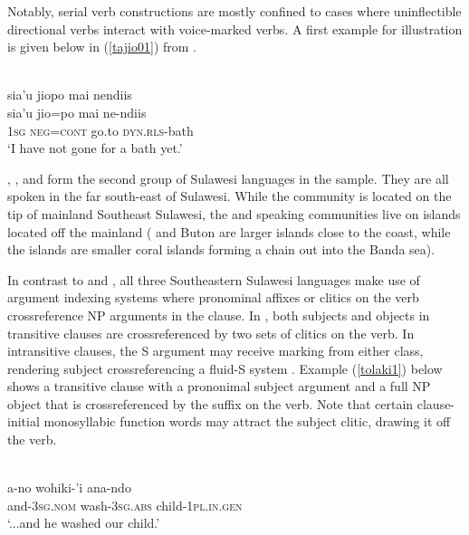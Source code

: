 Notably, serial verb constructions are mostly confined to cases where uninflectible directional verbs interact with voice-marked verbs. A first example for illustration is given below in (\ref{tajio01}) from .

\ea \label{tajio01}
\\
\glll sia’u jiopo mai nendiis \\
sia’u jio=po mai ne-ndiis \\
 \textsc{1}\textsc{sg} \textsc{neg}=\textsc{cont} go.to \textsc{dyn}.\textsc{rls}-bath\\
\glft ‘I have not gone for a bath yet.’\\ 
\z

, , and  form the second group of Sulawesi languages in the sample. They are all spoken in the far south-east of Sulawesi. While the  community is located on the tip of mainland Southeast Sulawesi, the  and  speaking communities live on islands located off the mainland ( and Buton are larger islands close to the coast, while the  islands are smaller coral islands forming a chain out into the Banda sea). 

In contrast to  and , all three Southeastern Sulawesi languages make use of argument indexing systems where pronominal affixes or clitics on the verb crossreference NP arguments in the clause. In , both subjects and objects in transitive clauses are crossreferenced by two sets of clitics on the verb. In intransitive clauses, the S argument may receive marking from either class, rendering  subject crossreferencing a fluid-S system \citep[115]{mead2008verb}. Example (\ref{tolaki1}) below shows a transitive clause with a prononimal subject argument and a full NP object that is crossreferenced by the suffix on the verb. Note that certain clause-initial monosyllabic function words may attract the subject clitic, drawing it off the verb.

\ea \label{tolaki1}
\\
\gll a-no wohiki-'i ana-ndo \\
and-\textsc{3}\textsc{sg}.\textsc{nom} wash-\textsc{3}\textsc{sg}.\textsc{abs} child-\textsc{1}\textsc{pl}.\textsc{in}.\textsc{gen} \\
\glft `...and he washed our child.'\\ 
\z


